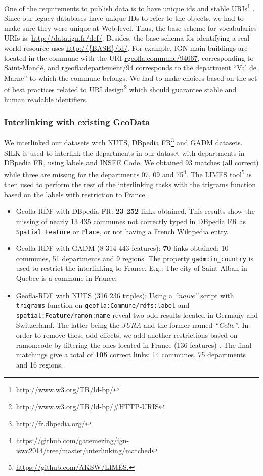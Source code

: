 One of the requirements to publish data is to have unique ids and stable URIs\footnote{\url{http://www.w3.org/TR/ld-bp/}} . Since our legacy databases have unique IDs to refer to the objects, we had to make sure they were unique at Web level. Thus, the base scheme for vocabularies URIs is: \url{http://data.ign.fr/def/}. Besides, the base schema for identifying a real world resource uses \url{http://{BASE}/id/}. For example, IGN main buildings  are located in the commune with the URI \url{rgeofla:commune/94067}, corresponding to Saint-Mand\'{e}, and \url{rgeofla:departement/94} corresponds to the department ``Val de Marne'' to which the commune belongs.
We had to make choices based on the set of best practices related to URI design\footnote{\url{http://www.w3.org/TR/ld-bp/\#HTTP-URIS}} which should guarantee stable and human readable identifiers.


\subsubsection{Interlinking with existing GeoData} \label{sec:mapping}
We interlinked our datasets with NUTS, DBpedia FR\footnote{\url{http://fr.dbpedia.org/}} and GADM datasets. SILK \cite{jentzsch2010silk} is used to interlink the departments in our dataset with departments in DBpedia FR, using labels and INSEE Code. We obtained $93$ matches (all correct) while three are missing for the departments 07, 09 and 75\footnote{\url{https://github.com/gatemezing/ign-iswc2014/tree/master/interlinking/matched}}. The
LIMES tool\footnote{\url{https://github.com/AKSW/LIMES.}} is then used to perform the rest of the interlinking tasks \cite{ngon13} with the trigrams function based on the labels with restriction to France.

\begin{itemize}
 \item Geofla-RDF with DBpedia FR: \textbf{23 252} links obtained. This results show the missing of nearly 13 435 communes not correctly typed in DBpedia FR as \texttt{Spatial Feature} or \texttt{Place}, or not having a French Wikipedia entry.
 \item Geofla-RDF with GADM (8 314 443 features): \textbf{70} links obtained: 10 communes, 51 departments and 9 regions. The property \texttt{gadm:in\_country} is used to restrict the interlinking to France. E.g.: The city of Saint-Alban in Quebec is a commune in France.
 \item Geofla-RDF with NUTS (316 236 triples): Using a \textit{``naive''} script with \texttt{trigrams} function on \texttt{geofla:Commune/rdfs:label} and \texttt{spatial:Feature/ramon:name} reveal two odd results located in Germany and Switzerland. The latter being the \textit{JURA } and the former named \textit{``Celle''}.  In order to remove those odd effects, we add another restrictions based on \textsf{ramon:code} by filtering the ones located in France (136 features) . The final matchings give a total of \textbf{105} correct links: 14 communes, 75 departments and 16 regions.
\end{itemize}

